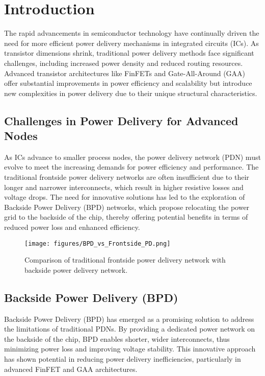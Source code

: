 \section{Introduction}

The rapid advancements in semiconductor technology have continually driven the need for more efficient power delivery mechanisms in integrated circuits (ICs). As transistor dimensions shrink, traditional power delivery methods face significant challenges, including increased power density and reduced routing resources. Advanced transistor architectures like FinFETs and Gate-All-Around (GAA) offer substantial improvements in power efficiency and scalability but introduce new complexities in power delivery due to their unique structural characteristics.

\subsection{Challenges in Power Delivery for Advanced Nodes}

As ICs advance to smaller process nodes, the power delivery network (PDN) must evolve to meet the increasing demands for power efficiency and performance. The traditional frontside power delivery networks are often insufficient due to their longer and narrower interconnects, which result in higher resistive losses and voltage drops. The need for innovative solutions has led to the exploration of Backside Power Delivery (BPD) networks, which propose relocating the power grid to the backside of the chip, thereby offering potential benefits in terms of reduced power loss and enhanced efficiency.

\begin{figure}[htbp]
    \centering
    \texttt{[image: figures/BPD\_vs\_Frontside\_PD.png]}
    \caption{Comparison of traditional frontside power delivery network with backside power delivery network.}
    \label{fig:BPD_vs_Frontside_PD}
\end{figure}

\subsection{Backside Power Delivery (BPD)}

Backside Power Delivery (BPD) has emerged as a promising solution to address the limitations of traditional PDNs. By providing a dedicated power network on the backside of the chip, BPD enables shorter, wider interconnects, thus minimizing power loss and improving voltage stability. This innovative approach has shown potential in reducing power delivery inefficiencies, particularly in advanced FinFET and GAA architectures.

